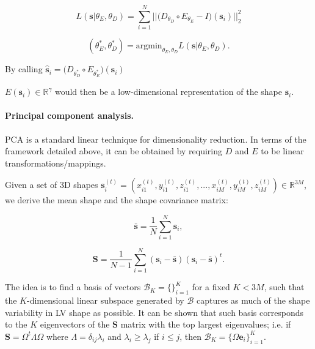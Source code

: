 \documentclass[twocolumn]{llncs}
\begin{document}
\begin{equation}
L(\textbf{s}|\theta_E, \theta_D)=
\sum_{i=1}^{N} \big|\big|\big(D_{\theta_D} \circ E_{\theta_E} - I\big) (\textbf{s}_i) \big|\big|_2^2
\end{equation}{}


\begin{equation}
(\theta_E^*, \theta_D^*) = \text{argmin}_{\theta_E, \theta_D}L(\textbf{s}|\theta_E, \theta_D).    
\end{equation}{}


By calling $\hat{\textbf{s}}_i=\big(D_{\theta_D^*} \circ E_{\theta_E^*}\big)(\textbf{s}_i)$

$E(\textbf{s}_i)\in\mathbb{R}^{\gamma}$ would then be a low-dimensional representation of the shape $\textbf{s}_i$.

\paragraph{Principal component analysis.}
PCA is a standard linear technique for dimensionality reduction. In terms of the framework detailed above, it can be obtained by requiring $D$ and $E$ to be linear transformations/mappings.

Given a set of 3D shapes $\textbf{s}_i^{(t)}=(x_{i1}^{(t)}, y_{i1}^{(t)}, z_{i1}^{(t)}, ..., x_{iM}^{(t)}, y_{iM}^{(t)}, z_{iM}^{(t)})\in \mathbb{R}^{3M}$, we derive the mean shape and the shape covariance matrix:

\begin{equation}
\bar{\textbf{s}}=\frac{1}{N}\sum_{i=1}^{N}{\textbf{s}}_i,
\end{equation}

\begin{equation}
\textbf{S}=\frac{1}{N-1}\sum_{i=1}^{N}({\textbf{s}}_i-\bar{\textbf{s}})({\textbf{s}}_i-\bar{\textbf{s}})^t.
\end{equation}

The idea is to find a basis of vectors $\mathcal{B}_{K}=\{\}_{i=1}^{K}$ for a fixed $K < 3M$, such that the $K$-dimensional linear subspace generated by $\mathcal{B}$ captures as much of the shape variability in LV shape as possible. It can be shown that such basis corresponds to the $K$ eigenvectors of the $\textbf{S}$ matrix with the top largest eigenvalues; i.e. if $\textbf{S}=\Omega^{t}\Lambda\Omega$ where $\Lambda=\delta_{ij}\lambda_i$ and $\lambda_i \geq \lambda_j$ if $i\leq j$, then $\mathcal{B}_{K}=\{{\Omega\textbf{e}_i}\}_{i=1}^{K}$.
\end{document}
